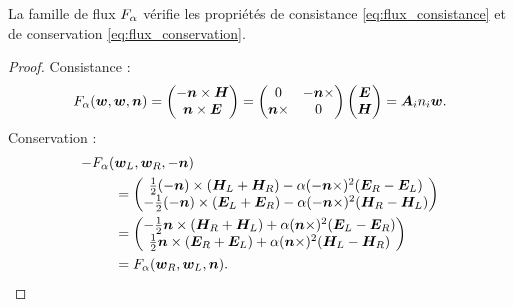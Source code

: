\begin{proposition}
	La famille de flux $F_\alpha$ vérifie les
	propriétés de consistance \eqref{eq:flux_consistance}
	et de conservation \eqref{eq:flux_conservation}.
\end{proposition}
\begin{proof}
	Consistance :
	\begin{align}
		F_\alpha (\bm{w}, \bm{w}, \bm{n}) =
		\begin{pmatrix}
			- \bm{n} \times \bm{H} \\
			\bm{n} \times \bm{E}
		\end{pmatrix} =
		\begin{pmatrix}
			0 & - \bm{n} \times \\
			\bm{n} \times & 0
		\end{pmatrix}
		\begin{pmatrix}
			\bm{E} \\
			\bm{H}
		\end{pmatrix} =
		{\bm{A}_{i}n_{i}} \bm{w} .
	\end{align}
	Conservation :
	\begin{equation}
		\begin{aligned}
			- F_\alpha (&\bm{w}_L, \bm{w}_R, -\bm{n}) \\ &=
			\begin{pmatrix}
				\frac{1}{2} (-\bm{n}) \times (\bm{H}_L + \bm{H}_R)
				- \alpha (-\bm{n} \times)^2 (\bm{E}_R - \bm{E}_L) \\
				- \frac{1}{2} (-\bm{n}) \times (\bm{E}_L + \bm{E}_R)
				- \alpha (-\bm{n} \times)^2 (\bm{H}_R - \bm{H}_L)
			\end{pmatrix} \\ &=
			\begin{pmatrix}
				- \frac{1}{2} \bm{n} \times (\bm{H}_R + \bm{H}_L)
				+ \alpha (\bm{n} \times)^2 (\bm{E}_L - \bm{E}_R) \\
				\frac{1}{2} \bm{n} \times (\bm{E}_R + \bm{E}_L)
				+ \alpha (\bm{n} \times)^2 (\bm{H}_L - \bm{H}_R)
			\end{pmatrix} \\
			&= F_\alpha (\bm{w}_R, \bm{w}_L, \bm{n}) .
		\end{aligned}
	\end{equation}
\end{proof}

